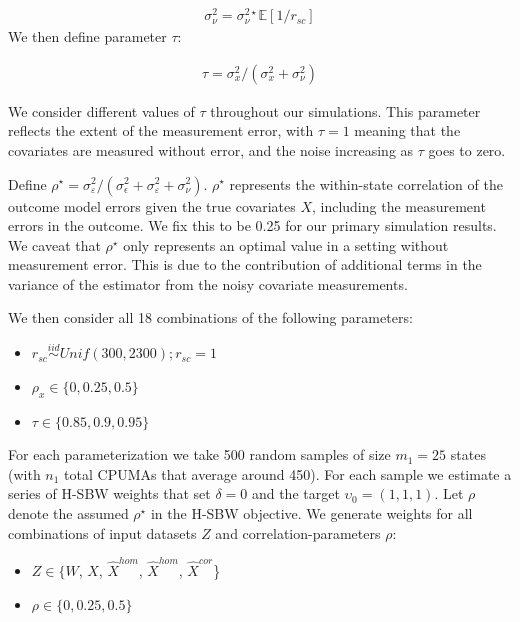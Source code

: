 \begin{align*}
    \sigma_{\nu}^2 =
     \sigma_\nu^{2\star}\mathbb{E}[1/r_{sc}]
\end{align*}
%
We then define parameter $\tau$:

\begin{align*}
    \tau = \sigma^2_x/(\sigma^2_x + \sigma^2_{\nu})
\end{align*}

We consider different values of $\tau$ throughout our simulations. This parameter reflects the extent of the measurement error, with $\tau = 1$ meaning that the covariates are measured without error, and the noise increasing as $\tau$ goes to zero.

Define $\rho^\star = \sigma^2_{\varepsilon}/(\sigma^2_{\epsilon} + \sigma^2_{\varepsilon} + \sigma^2_{\nu})$. $\rho^\star$ represents the within-state correlation of the outcome model errors given the true covariates $X$, including the measurement errors in the outcome. We fix this to be 0.25 for our primary simulation results. We caveat that $\rho^\star$ only represents an optimal value in a setting without measurement error. This is due to the contribution of additional terms in the variance of the estimator from the noisy covariate measurements.  

We then consider all 18 combinations of the following parameters:

\begin{itemize}
    \item $r_{sc} \stackrel{iid}\sim Unif(300, 2300); r_{sc} = 1$ 
    \item $\rho_x \in \{0, 0.25, 0.5\}$
    \item $\tau \in \{0.85, 0.9, 0.95\}$
\end{itemize}

For each parameterization we take 500 random samples of size $m_1 = 25$ states (with $n_1$ total CPUMAs that average around 450). For each sample we estimate a series of H-SBW weights that set $\delta = 0$ and the target $\upsilon_0 = (1, 1, 1)$. Let $\rho$ denote the assumed $\rho^\star$ in the H-SBW objective. We generate weights for all combinations of input datasets $Z$ and correlation-parameters $\rho$:

\begin{itemize}
    \item $Z \in \{W$, $X$, $\hat{X}^{hom}$, $\hat{X}^{hom}$, $\hat{X}^{cor}$\}
    \item $\rho \in \{0, 0.25, 0.5\}$
\end{itemize}

